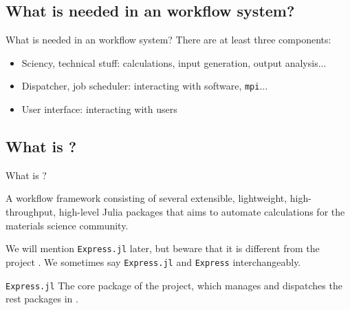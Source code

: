 \subsection{What is needed in an \ab{} workflow system?}

\begin{frame}{What is needed in an \ab{} workflow system?}
    There are at least three components:

    \begin{itemize}
        \item Sciency, technical stuff: calculations, input generation, output analysis...
        \item Dispatcher, job scheduler: interacting with \ab{} software, \texttt{mpi}...
        \item User interface: interacting with users
    \end{itemize}
\end{frame}

\subsection{What is \express{}?}

\begin{frame}{What is \express{}?}
    \begin{definitionblock}{\express{}}
        A workflow framework consisting of several extensible, lightweight, high-throughput,
        high-level Julia packages that aims to automate \ab{} calculations for the materials
        science community.
    \end{definitionblock}

    We will mention \texttt{Express.jl} later, but beware that it is different from the
    project \express{}. We sometimes say \texttt{Express.jl} and \texttt{Express}
    interchangeably.

    \begin{definitionblock}{\texttt{Express.jl}}
        The core package of the \express{} project, which manages and dispatches the rest
        packages in \express{}.
    \end{definitionblock}
\end{frame}

